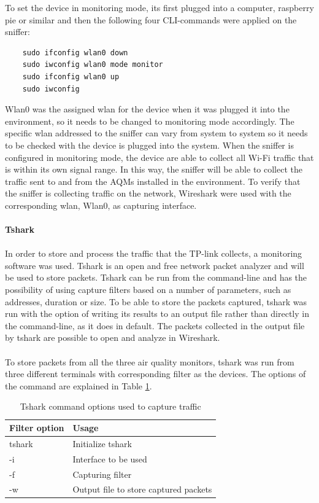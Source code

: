 To set the device in monitoring mode, its first plugged into a computer, raspberry pie or similar and then the following four CLI-commands were applied on the sniffer:

\begin{verbatim}
    sudo ifconfig wlan0 down
    sudo iwconfig wlan0 mode monitor
    sudo ifconfig wlan0 up
    sudo iwconfig
\end{verbatim}

Wlan0 was the assigned wlan for the device when it was plugged it into the environment, so it needs to be changed to monitoring mode accordingly. The specific wlan addressed to the sniffer can vary from system to system so it needs to be checked with the device is plugged into the system. When the sniffer is configured in monitoring mode, the device are able to collect all Wi-Fi traffic that is within its own signal range. In this way, the sniffer will be able to collect the traffic sent to and from the AQMs installed in the environment. To verify that the sniffer is collecting traffic on the network, Wireshark were used with the corresponding wlan, Wlan0, as capturing interface. 
\\\\
\textbf{Tshark}\\\\
In order to store and process the traffic that the TP-link collects, a monitoring software was used. Tshark \cite{Tshark} is an open and free network packet analyzer and will be used to store packets. Tshark can be run from the command-line and has the possibility of using capture filters based on a number of parameters, such as addresses, duration or size. To be able to store the packets captured, tshark was run with the option of writing its results to an output file rather than directly in the command-line, as it does in default. The packets collected in the output file by tshark are possible to open and analyze in Wireshark. 
\\\\
To store packets from all the three air quality monitors, tshark was run from three different terminals with corresponding filter as the devices. The options of the command are explained in Table \ref{tab:tshark}.

\begin{table}[H]
    \centering
    \caption{Tshark command options used to capture traffic}
    \begin{tabular}{|l|l|}
    \hline
    \textbf{Filter option} & \textbf{Usage}                        \\ \hline
    tshark                 & Initialize tshark                     \\ \hline
    -i                     & Interface to be used                  \\ \hline
    -f                     & Capturing filter                      \\ \hline
    -w                     & Output file to store captured packets \\ \hline
    \end{tabular}
    \label{tab:tshark}
\end{table}


